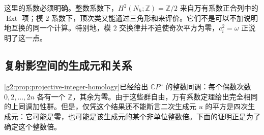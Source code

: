 这里的系数必须明确。整数系数下，\(H^2(N_h;\mathbb Z)=\mathbb Z/2\) 来自万有系数正合列中的 \(\operatorname{Ext}\) 项；模 \(2\) 系数下，顶次类又能通过三角形和来评价。它们不是可以不加说明地互换的同一个计算。特别地，模 \(2\) 交换律并不迫使奇次平方为零，\(c_i^2=\omega\) 正说明了这一点。

\subsection{复射影空间的生成元和关系}
\label{g2:subsec:0405:02}
\cref{g2:prop:projective-integer-homology}已经给出 \(\mathbb CP^n\) 的整数同调：每个偶数次数 \(0,2,\ldots,2n\) 各有一个 \(\mathbb Z\)，其余为零。由于这些群自由，万有系数定理给出完全相同的上同调加性群。但是，仅凭这个结果还不能断言二次生成元 \(u\) 的平方是四次生成元：它可能是零，也可能是该生成元的某个非单位整数倍。下面的证明正是为了确定这个整数倍。

